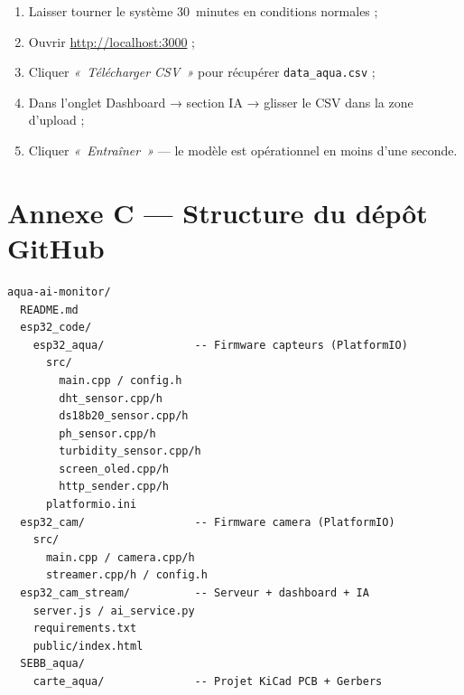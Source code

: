 \documentclass[12pt,a4paper]{report}
\newcommand{\code}[1]{\texttt{\small\colorbox{codebg}{#1}}}
\begin{document}
\begin{enumerate}
  \item Laisser tourner le système 30~minutes en conditions normales ;
  \item Ouvrir \url{http://localhost:3000} ;
  \item Cliquer \textit{«~Télécharger CSV~»} pour récupérer \code{data\_aqua.csv} ;
  \item Dans l'onglet Dashboard → section IA → glisser le CSV dans la zone d'upload ;
  \item Cliquer \textit{«~Entraîner~»} --- le modèle est opérationnel en moins d'une seconde.
\end{enumerate}

\chapter{Annexe C --- Structure du dépôt GitHub}

\begin{lstlisting}[caption={Arborescence du dépôt aqua-ai-monitor}]
aqua-ai-monitor/
  README.md
  esp32_code/
    esp32_aqua/              -- Firmware capteurs (PlatformIO)
      src/
        main.cpp / config.h
        dht_sensor.cpp/h
        ds18b20_sensor.cpp/h
        ph_sensor.cpp/h
        turbidity_sensor.cpp/h
        screen_oled.cpp/h
        http_sender.cpp/h
      platformio.ini
  esp32_cam/                 -- Firmware camera (PlatformIO)
    src/
      main.cpp / camera.cpp/h
      streamer.cpp/h / config.h
  esp32_cam_stream/          -- Serveur + dashboard + IA
    server.js / ai_service.py
    requirements.txt
    public/index.html
  SEBB_aqua/
    carte_aqua/              -- Projet KiCad PCB + Gerbers
\end{lstlisting}
\end{document}

